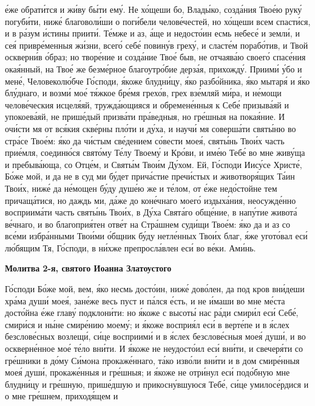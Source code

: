 е́же обрати́тся и жи́ву бы́ти ему́. Не хо́щеши бо, Влады́ко, созда́ния Твое́ю
руку́ погуби́ти, ниже́ благоволи́ши о поги́бели челове́честей, но хо́щеши всем
спасти́ся, и в ра́зум и́стины приити́. Те́мже и аз, а́ще и недосто́ин есмь небесе́
и земли́, и сея́ привре́менныя жи́зни, всего́ себе́ повину́в греху́, и сласте́м
порабо́тив, и Твой оскверни́в о́браз; но творе́ние и созда́ние Твое́ быв, не
отчаява́ю своего́ спасе́ния окая́нный, на Твое́ же безме́рное благоутро́бие
дерза́я, прихожду́. Приими́ у́бо и мене́, Человеколю́бче Го́споди, я́коже
блудни́цу, я́ко разбо́йника, я́ко мытаря́ и я́ко блу́днаго, и возми́ мое́ тя́жкое
бре́мя грехо́в, грех взе́мляй ми́ра, и не́мощи челове́ческия исцеля́яй,
тружда́ющияся и обремене́нныя к Себе́ призыва́яй и упокоева́яй, не
прише́дый призва́ти пра́ведныя, но гре́шныя на покая́ние. И очи́сти мя
от вся́кия скве́рны пло́ти и ду́ха, и научи́ мя соверша́ти святы́ню
во стра́се Твое́м: я́ко да чи́стым све́дением со́вести моея́, святы́нь
Твои́х часть прие́мля, соединю́ся свято́му Те́лу Твоему́ и Кро́ви, и
име́ю Тебе́ во мне живу́ща и пребыва́юща, со Отце́м, и Святы́м Твои́м
Ду́хом. Ей, Го́споди Иису́се Христе́, Бо́же мой, и да не в суд ми бу́дет
прича́стие пречи́стых и животворя́щих Та́ин Твои́х, ниже́ да не́мощен бу́ду
душе́ю же и те́лом, от е́же недо́стойне тем причаща́тися, но даждь ми,
да́же до коне́чнаго моего́ издыха́ния, неосужде́нно восприима́ти часть
святы́нь Твои́х, в Ду́ха Свята́го обще́ние, в напу́тие живота́ ве́чнаго, и
во благоприя́тен отве́т на Стра́шнем суди́щи Твое́м: я́ко да и аз со
все́ми избра́нными Твои́ми о́бщник бу́ду нетле́нных Твои́х благ, я́же
угото́вал еси́ лю́бящим Тя, Го́споди, в ни́хже препросла́влен еси́ во ве́ки.
Ами́нь.



 

\bfseries Молитва 2-я, святого Иоанна Златоустого\normalfont{}


   Го́споди Бо́же мой, вем, я́ко несмь досто́ин, ниже́ дово́лен, да под кров
вни́деши хра́ма души́ моея́, зане́же весь пуст и па́лся е́сть, и не и́маши во мне
ме́ста досто́йна е́же главу́ подклони́ти: но я́коже с высоты́ нас ра́ди смири́л
еси́ Себе́, смири́ся и ны́не смире́нию моему́; и я́коже восприя́л еси́ в верте́пе и
в я́слех безслове́сных возлещи́, си́це восприими́ и в я́слех безслове́сныя моея́
души́, и во оскверне́нное мое́ те́ло вни́ти. И я́коже не неудосто́ил еси́ вни́ти, и
свечеря́ти со гре́шники в до́му Си́мона прокаже́ннаго, та́ко изво́ли вни́ти
и в дом смире́нныя моея́ души́, прокаже́нныя и гре́шныя; и я́коже
не отри́нул еси́ подо́бную мне блудни́цу и гре́шную, прише́дшую и
прикосну́вшуюся Тебе́, си́це умилосе́рдися и о мне гре́шнем, приходя́щем и

